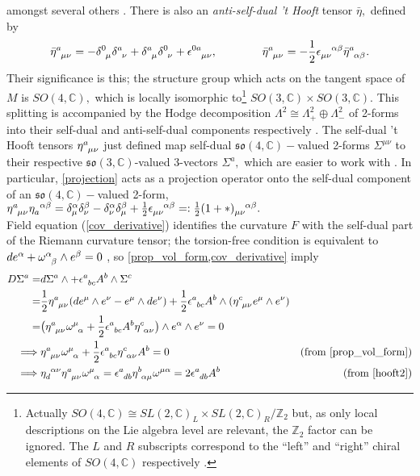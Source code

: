 \documentclass[a4paper,12pt, onecolumn, notitlepage]{article}
\theoremstyle{definition}
\theoremstyle{remark}
\newcommand{\al}{\alpha}
\newcommand{\w}{\omega}
\newcommand{\m}{\mu}
\newcommand{\n}{\nu}
\newcommand{\e}{\epsilon}
\newcommand{\hooft}[3]{\eta\indices{^{#1}_{#2}_{#3}}}
\newcommand{\ihooft}[3]{\eta\indices{_{#1}^{#2}^{#3}}}
\begin{document}
amongst several others \cite{hooft_1976}. There is also an \emph{anti-self-dual 't Hooft} tensor $\bar{\eta},$ defined by
\begin{equation}
\label{asdhooft}
\bar{\eta}\indices{^a_\m_\n} =  -\delta\indices{^0_\mu}\delta\indices{^a_\nu} + \delta\indices{^a_\mu}\delta\indices{^0_\nu} + \epsilon\indices{^0^a_\mu_\nu},\qquad\qquad\bar{\eta}\indices{^a_\m_\n}=-\frac{1}{2}\e\indices{_\m_\n^\al^\beta}\bar{\eta}\indices{^a_\al_\beta}.\\
\end{equation}
Their significance is this; the structure group which acts on the tangent space of $M$ is $SO(4,\mathbb{C}),$ which is locally isomorphic to\footnote{Actually $SO(4,\mathbb{C}) \cong SL(2,\mathbb{C})_{L}\times SL(2,\mathbb{C})_{R}/\mathbb{Z}_{2}$ but, as only local descriptions on the Lie algebra level are relevant, the $\mathbb{Z}_{2}$ factor can be ignored. The $L$ and $R$ subscripts correspond to the ``left'' and ``right'' chiral elements of $SO(4,\mathbb{C})$ respectively \cite{lee_2011}.} $SO(3,\mathbb{C})\times SO(3,\mathbb{C}).$ This splitting is accompanied by the Hodge decomposition $\Lambda^{2}\cong\Lambda_{+}^{2}\oplus\Lambda^{2}_{-}$ of 2-forms into their self-dual and anti-self-dual components respectively \cite{atiyah_1978, lee_2011}. The self-dual 't Hooft tensors $\hooft{a}{\m}{\n}$ just defined map self-dual $\mathfrak{so}(4,\mathbb{C})-$valued 2-forms $\Sigma^{\m\n}$ to their respective $\mathfrak{so}(3,\mathbb{C})$-valued 3-vectors $\Sigma^{a},$ which are easier to work with \cite{hooft_1976}. In particular, \cref{projection} acts as a projection operator onto the self-dual component of an $\mathfrak{so}(4,\mathbb{C})-$valued 2-form, $\hooft{a}{\m}{\n}\ihooft{a}{\al}{\beta} = \delta^{\al}_{\m}\delta^{\beta}_{\n} - \delta^{\al}_{\n}\delta^{\beta}_{\m} +\frac{1}{2}\e\indices{_\m_\n^\al^\beta} =: \frac{1}{2}(1+\ast)\indices{_\m_\n^\al^\beta}.$\\
Field equation (\ref{cov_derivative}) identifies the curvature $F$ with the self-dual part of the Riemann curvature tensor; the torsion-free condition is equivalent to $de\indices{^\al} + \w\indices{^\al_\beta}\wedge e\indices{^\beta}=0$ \cite{eguchi_1980}, so \cref{prop_vol_form,cov_derivative} imply
\begin{align*}
	D\Sigma\indices{^a} =& d\Sigma\indices{^a}\wedge + \e\indices{^a_b_c}A\indices{^b}\wedge\Sigma\indices{^c}\\
	=&\frac{1}{2}\hooft{a}{\m}{\n}(de\indices{^\m}\wedge e\indices{^\n} - e\indices{^\m}\wedge de\indices{^\n}) +\frac{1}{2}\e\indices{^a_b_c}A^{b}\wedge (\hooft{c}{\m}{\n}e^{\m}\wedge e^{\n})\\
	=&\big(\hooft{a}{\m}{\n}\w\indices{^\m_\al} +\frac{1}{2}\e\indices{^a_b_c}A\indices{^b}\hooft{c}{\al}{\n}\big)\wedge e^{\al}\wedge e^{\n}=0\\
	\implies& \hooft{a}{\m}{\n}\w\indices{^\m_\al} +\frac{1}{2}\e\indices{^a_b_c}\hooft{c}{\al}{\n}A^{b}=0 &(\text{from \ref{prop_vol_form})}\\
	\implies& \ihooft{d}{\al}{\n}\hooft{a}{\m}{\n}\w\indices{^\m_\al}=\e\indices{^a_d_b}\hooft{b}{\al}{\m}\w\indices{^\m^\al}=2\e\indices{^a_d_b}A^{b} &(\text{from \ref{hooft2})}
\end{align*}
\end{document}
